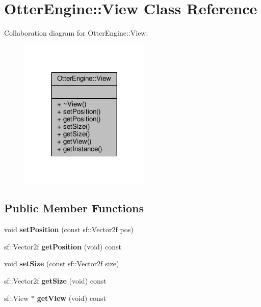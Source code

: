\hypertarget{class_otter_engine_1_1_view}{}\section{Otter\+Engine\+:\+:View Class Reference}
\label{class_otter_engine_1_1_view}


Collaboration diagram for Otter\+Engine\+:\+:View\+:\nopagebreak
\begin{figure}[H]
\begin{center}
\leavevmode
\includegraphics[width=176pt]{d7/d2c/class_otter_engine_1_1_view__coll__graph}
\end{center}
\end{figure}
\subsection*{Public Member Functions}
\begin{DoxyCompactItemize}
\item 
void {\bfseries set\+Position} (const sf\+::\+Vector2f pos)\hypertarget{class_otter_engine_1_1_view_aaad71a6c2d7f16e5c8cdc4297755ff8b}{}\label{class_otter_engine_1_1_view_aaad71a6c2d7f16e5c8cdc4297755ff8b}

\item 
sf\+::\+Vector2f {\bfseries get\+Position} (void) const \hypertarget{class_otter_engine_1_1_view_a97e142b1180d8a277be6e417bd08e3d5}{}\label{class_otter_engine_1_1_view_a97e142b1180d8a277be6e417bd08e3d5}

\item 
void {\bfseries set\+Size} (const sf\+::\+Vector2f size)\hypertarget{class_otter_engine_1_1_view_a726c06fb9c9353ee0f33df8a05c86639}{}\label{class_otter_engine_1_1_view_a726c06fb9c9353ee0f33df8a05c86639}

\item 
sf\+::\+Vector2f {\bfseries get\+Size} (void) const \hypertarget{class_otter_engine_1_1_view_ab8d8e167ebe8a392d913879a449a9f09}{}\label{class_otter_engine_1_1_view_ab8d8e167ebe8a392d913879a449a9f09}

\item 
sf\+::\+View $\ast$ {\bfseries get\+View} (void) const \hypertarget{class_otter_engine_1_1_view_a6c014ee2fa02c60631e29ddc26fef6d3}{}\label{class_otter_engine_1_1_view_a6c014ee2fa02c60631e29ddc26fef6d3}

\end{DoxyCompactItemize}
